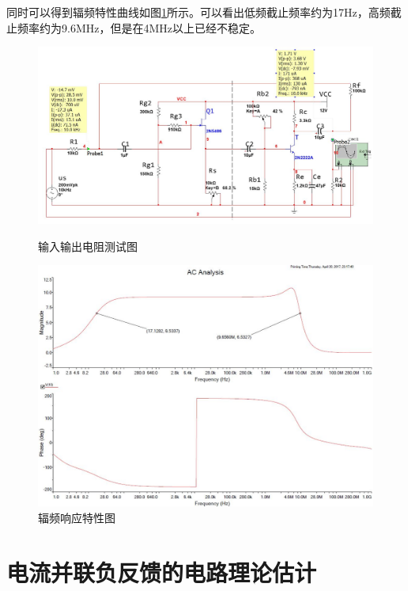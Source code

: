 \documentclass[UTF8,a4paper]{ctexart}
\begin{document}
同时可以得到辐频特性曲线如图\ref{F}所示。可以看出低频截止频率约为17Hz，高频截止频率约为9.6MHz，但是在4MHz以上已经不稳定。

\begin{figure}
\centering
\includegraphics[width=\textwidth]{R.jpg}
\caption{输入输出电阻测试图}
\label{R}
\includegraphics[width=\textwidth]{F.jpg}
\caption{辐频响应特性图}
\label{F}
\end{figure}
\section{电流并联负反馈的电路理论估计}
\end{document}
